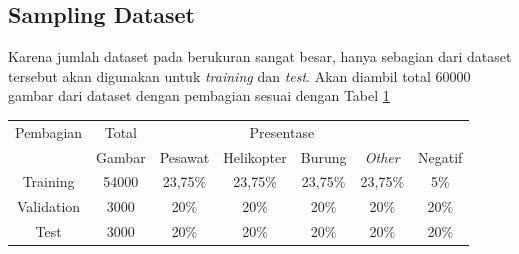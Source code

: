  \subsection{Sampling Dataset}
    Karena jumlah dataset pada \textcite{aot_dataset} berukuran sangat besar, hanya sebagian dari dataset tersebut akan digunakan untuk \emph{training} dan \emph{test}.
    Akan diambil total 60000 gambar dari dataset dengan pembagian sesuai dengan Tabel \ref{tbl:datasetsamplingdist}
    \begin{table}[h]
      \centering
      \label{tbl:datasetsamplingdist}
      \begin{tabular}{|c|c|c|c|c|c|c|}
        \hline
        Pembagian &Total & \multicolumn{4}{c}{Presentase}&\\
                           \cline{2-7}
                  &Gambar& Pesawat & Helikopter & Burung & \emph{Other} & Negatif\\
        \hline
        Training  &54000 &23,75\%  &23,75\%     &23,75\% &23,75\%       &5\%\\
        \hline                                              
        Validation&3000  &20\%     &20\%        &20\%    &20\%          &20\%\\
        \hline                                                           
        Test      &3000  &20\%     &20\%        &20\%    &20\%          &20\%\\
        \hline
      \end{tabular}
    \end{table}







